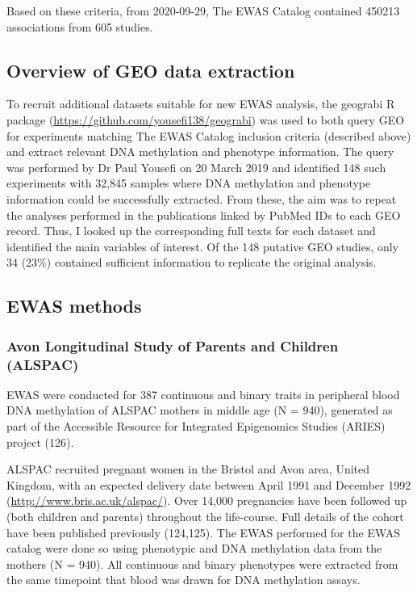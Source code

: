 \documentclass[11pt,oneside]{bristolthesis}
\begin{document}
Based on these criteria, from 2020-09-29, The EWAS Catalog contained 450213 associations from 605 studies.

\hypertarget{overview-of-geo-data-extraction}{%
\subsection{Overview of GEO data extraction}\label{overview-of-geo-data-extraction}}

To recruit additional datasets suitable for new EWAS analysis, the geograbi R package (\url{https://github.com/yousefi138/geograbi}) was used to both query GEO for experiments matching The EWAS Catalog inclusion criteria (described above) and extract relevant DNA methylation and phenotype information. The query was performed by Dr Paul Yousefi on 20 March 2019 and identified 148 such experiments with 32,845 samples where DNA methylation and phenotype information could be successfully extracted. From these, the aim was to repeat the analyses performed in the publications linked by PubMed IDs to each GEO record. Thus, I looked up the corresponding full texts for each dataset and identified the main variables of interest. Of the 148 putative GEO studies, only 34 (23\%) contained sufficient information to replicate the original analysis.

\hypertarget{ewas-methods-03}{%
\subsection{EWAS methods}\label{ewas-methods-03}}

\hypertarget{alspac-03}{%
\subsubsection{Avon Longitudinal Study of Parents and Children (ALSPAC)}\label{alspac-03}}

EWAS were conducted for 387 continuous and binary traits in peripheral blood DNA methylation of ALSPAC mothers in middle age (N = 940), generated as part of the Accessible Resource for Integrated Epigenomics Studies (ARIES) project (126).

ALSPAC recruited pregnant women in the Bristol and Avon area, United Kingdom, with an expected delivery date between April 1991 and December 1992 (\url{http://www.bris.ac.uk/alspac/}). Over 14,000 pregnancies have been followed up (both children and parents) throughout the life-course. Full details of the cohort have been published previously (124,125). The EWAS performed for the EWAS catalog were done so using phenotypic and DNA methylation data from the mothers (N = 940).
All continuous and binary phenotypes were extracted from the same timepoint that blood was drawn for DNA methylation assays.
\end{document}
